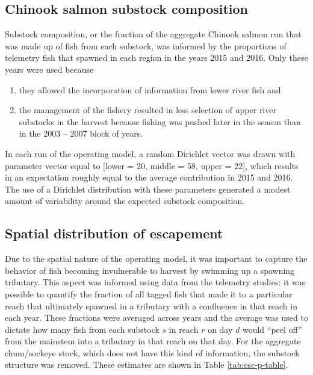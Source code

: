 \documentclass[12pt,]{book}
\theoremstyle{definition}
\theoremstyle{definition}
\theoremstyle{definition}
\theoremstyle{remark}
\begin{document}
\subsection{Chinook salmon substock
composition}\label{chinook-salmon-substock-composition}

\noindent
Substock composition, or the fraction of the aggregate Chinook salmon
run that was made up of fish from each substock, was informed by the
proportions of telemetry fish that spawned in each region in the years
2015 and 2016. Only these years were used because

\begin{enumerate}
\def\labelenumi{(\arabic{enumi})}
\item
  they allowed the incorporation of information from lower river fish
  and
\item
  the management of the fishery resulted in less selection of upper
  river substocks in the harvest because fishing was pushed later in the
  season than in the 2003 -- 2007 block of years.
\end{enumerate}

\noindent
In each run of the operating model, a random Dirichlet vector was drawn
with parameter vector equal to {[}lower = 20, middle = 58, upper =
22{]}, which results in an expectation roughly equal to the average
contribution in 2015 and 2016. The use of a Dirichlet distribution with
these parameters generated a modest amount of variability around the
expected substock composition.

\subsection{Spatial distribution of escapement}\label{calc-esc-p}

\noindent
Due to the spatial nature of the operating model, it was important to
capture the behavior of fish becoming invulnerable to harvest by
swimming up a spawning tributary. This aspect was informed using data
from the telemetry studies: it was possible to quantify the fraction of
all tagged fish that made it to a particular reach that ultimately
spawned in a tributary with a confluence in that reach in each year.
These fractions were averaged across years and the average was used to
dictate how many fish from each substock \(s\) in reach \(r\) on day
\(d\) would ``peel off'' from the mainstem into a tributary in that
reach on that day. For the aggregate chum/sockeye stock, which does not
have this kind of information, the substock structure was removed. These
estimates are shown in Table \ref{tab:esc-p-table}.
\end{document}
